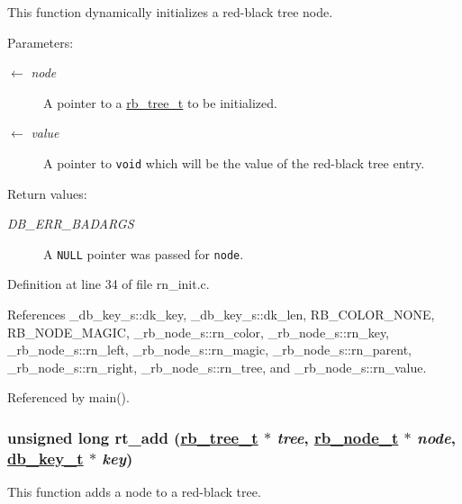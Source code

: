 This function dynamically initializes a red-black tree node.

\begin{Desc}
\item[Parameters:]
\begin{description}
\item[\mbox{$\leftarrow$} {\em node}]A pointer to a \hyperlink{group__dbprim__rbtree_ga0}{rb\_\-tree\_\-t} to be initialized. \item[\mbox{$\leftarrow$} {\em value}]A pointer to {\tt void} which will be the value of the red-black tree entry.\end{description}
\end{Desc}
\begin{Desc}
\item[Return values:]
\begin{description}
\item[{\em DB\_\-ERR\_\-BADARGS}]A {\tt NULL} pointer was passed for {\tt node}.\end{description}
\end{Desc}


Definition at line 34 of file rn\_\-init.c.

References \_\-db\_\-key\_\-s::dk\_\-key, \_\-db\_\-key\_\-s::dk\_\-len, RB\_\-COLOR\_\-NONE, RB\_\-NODE\_\-MAGIC, \_\-rb\_\-node\_\-s::rn\_\-color, \_\-rb\_\-node\_\-s::rn\_\-key, \_\-rb\_\-node\_\-s::rn\_\-left, \_\-rb\_\-node\_\-s::rn\_\-magic, \_\-rb\_\-node\_\-s::rn\_\-parent, \_\-rb\_\-node\_\-s::rn\_\-right, \_\-rb\_\-node\_\-s::rn\_\-tree, and \_\-rb\_\-node\_\-s::rn\_\-value.

Referenced by main().\hypertarget{group__dbprim__rbtree_ga6}{
\subsubsection[rt\_\-add]{\setlength{\rightskip}{0pt plus 5cm}unsigned long rt\_\-add (\hyperlink{struct__rb__tree__s}{rb\_\-tree\_\-t} $\ast$ {\em tree}, \hyperlink{struct__rb__node__s}{rb\_\-node\_\-t} $\ast$ {\em node}, \hyperlink{struct__db__key__s}{db\_\-key\_\-t} $\ast$ {\em key})}}
\label{group__dbprim__rbtree_ga6}


This function adds a node to a red-black tree.

